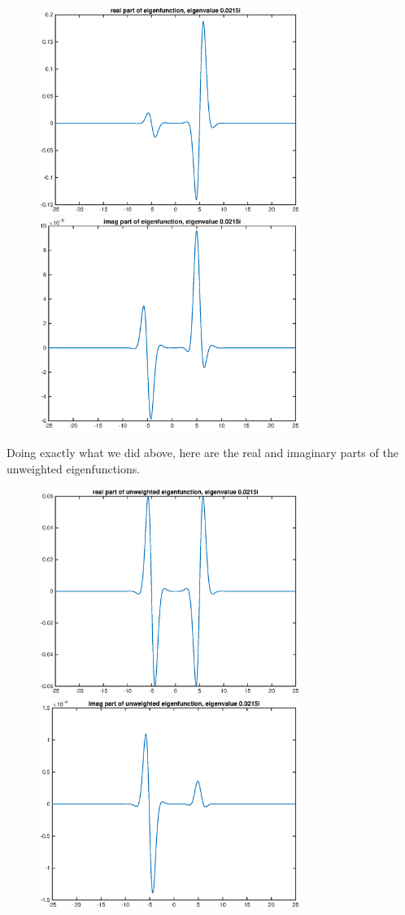 \documentclass[12pt]{article}
\begin{document}
\begin{figure}[H]
\includegraphics[width=8.5cm]{1double4eigenfnreal}
\includegraphics[width=8.5cm]{1double4eigenfnimag}
\end{figure}
Doing exactly what we did above, here are the real and imaginary parts of the unweighted eigenfunctions.
\begin{figure}[H]
\includegraphics[width=8.5cm]{1double4eigenfnrealunweighted}
\includegraphics[width=8.5cm]{1double4eigenfnimagunweighted}
\end{figure}
\end{document}
